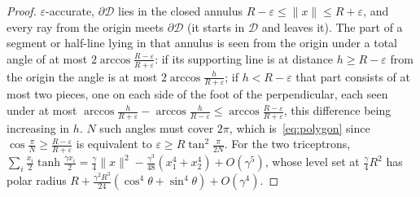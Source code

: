 \documentclass[11pt,a4paper]{article}
\theoremstyle{plain}
\theoremstyle{definition}
\theoremstyle{remark}
\begin{document}
\begin{proof}
$\varepsilon$-accurate, $\partial\mathcal D$ lies in the closed annulus
$R-\varepsilon\le\|x\|\le R+\varepsilon$, and every ray from the origin
meets $\partial\mathcal D$ (it starts in $\mathcal D$ and leaves it). The
part of a segment or half-line lying in that annulus is seen from the origin
under a total angle of at most $2\arccos\frac{R-\varepsilon}{R+\varepsilon}$:
if its supporting line is at distance $h\ge R-\varepsilon$ from the origin
the angle is at most $2\arccos\frac{h}{R+\varepsilon}$; if $h<R-\varepsilon$
that part consists of at most two pieces, one on each side of the foot of
the perpendicular, each seen under at most
$\arccos\frac{h}{R+\varepsilon}-\arccos\frac{h}{R-\varepsilon}\le\arccos\frac{R-\varepsilon}{R+\varepsilon}$,
this difference being increasing in $h$. $N$ such angles must cover $2\pi$,
which is~\eqref{eq:polygon} since
$\cos\frac\pi N\ge\frac{R-\varepsilon}{R+\varepsilon}$ is equivalent to
$\varepsilon\ge R\tan^2\frac\pi{2N}$. For the two triceptrons,
$\sum_i\tfrac{x_i}2\tanh\tfrac{\gamma x_i}2=\tfrac\gamma4\|x\|^2-\tfrac{\gamma^3}{48}(x_1^4+x_2^4)+O(\gamma^5)$,
whose level set at $\tfrac\gamma4R^2$ has polar radius
$R+\tfrac{\gamma^2R^3}{24}(\cos^4\theta+\sin^4\theta)+O(\gamma^4)$.
\end{proof}
\end{document}
